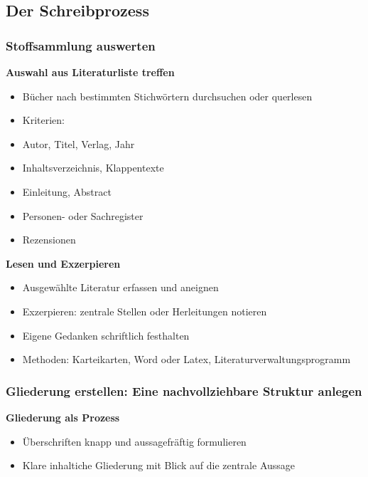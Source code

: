 \subsection{Der Schreibprozess}\label{der-schreibprozess}

\subsubsection{Stoffsammlung auswerten}\label{stoffsammlung-auswerten}

\textbf{Auswahl aus Literaturliste treffen}

\begin{itemize}%
\item
  Bücher nach bestimmten Stichwörtern durchsuchen oder querlesen
\item
  Kriterien:
\item
  Autor, Titel, Verlag, Jahr
\item
  Inhaltsverzeichnis, Klappentexte
\item
  Einleitung, Abstract
\item
  Personen- oder Sachregister
\item
  Rezensionen
\end{itemize}

\textbf{Lesen und Exzerpieren}

\begin{itemize}%
\item
  Ausgewählte Literatur erfassen und aneignen
\item
  Exzerpieren: zentrale Stellen oder Herleitungen notieren
\item
  Eigene Gedanken schriftlich festhalten
\item
  Methoden: Karteikarten, Word oder Latex, Literaturverwaltungsprogramm
\end{itemize}

\subsubsection{Gliederung erstellen: Eine nachvollziehbare Struktur
anlegen}\label{gliederung-erstellen-eine-nachvollziehbare-struktur-anlegen}

\textbf{Gliederung als Prozess}

\begin{itemize}%
\item
  Überschriften knapp und aussagefräftig formulieren
\item
  Klare inhaltiche Gliederung mit Blick auf die zentrale Aussage
\end{itemize}

